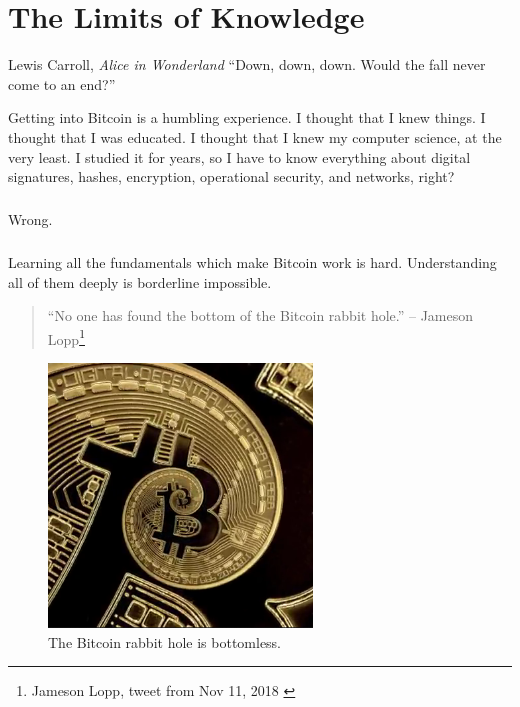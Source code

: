 \chapter{The Limits of Knowledge}
\label{les:7}

\begin{chapquote}{Lewis Carroll, \textit{Alice in Wonderland}}
\enquote{Down, down, down. Would the fall never come to an end?}
\end{chapquote}

Getting into Bitcoin is a humbling experience. I thought that I knew
things. I thought that I was educated. I thought that I knew my computer
science, at the very least. I studied it for years, so I have to know
everything about digital signatures, hashes, encryption, operational
security, and networks, right?

\paragraph{}
Wrong.

\paragraph{}
Learning all the fundamentals which make Bitcoin work is hard.
Understanding all of them deeply is borderline impossible.

\begin{samepage}\begin{quotation}
\enquote{No one has found the bottom of the Bitcoin rabbit hole.}
\flushright -- Jameson Lopp\footnote{Jameson Lopp, tweet from Nov 11, 2018 \cite{lopp-tweet}}
\end{quotation}\end{samepage}

\begin{figure}
  \centering
  \includegraphics[width=7cm]{assets/images/rabbit-hole-bottomless.png}
  \caption{The Bitcoin rabbit hole is bottomless.}
  \label{fig:rabbit-hole-bottomless}
\end{figure}

